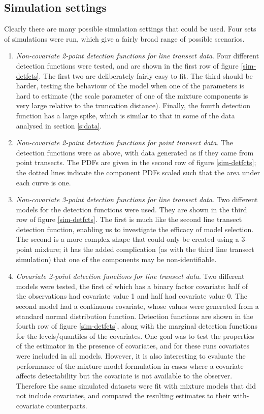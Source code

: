 \subsection{Simulation settings}
\label{cor-8s10}
Clearly there are many possible simulation settings that could be used. Four sets of simulations were run, which give a fairly broad range of possible scenarios.
\begin{enumerate}
	\item \textit{Non-covariate 2-point detection functions for line transect data}. Four different detection functions were tested, and are shown in the first row of figure \ref{sim-detfcts}. The first two are deliberately fairly easy to fit. The third should be harder, testing the behaviour of the model when one of the parameters is hard to estimate (the scale parameter of one of the mixture components is very large relative to the truncation distance). Finally, the fourth detection function has a large spike, which is similar to that in some of the data analysed in section \ref{s:data}.
	\item \textit{Non-covariate 2-point detection functions for point transect data}.  The detection functions were as above, with data generated as if they\label{cor-r1-8} came from point transects. The PDFs are given in the second row of figure \ref{sim-detfcts}; the dotted lines indicate the component PDFs scaled such that the area under each curve is one.
	\item \textit{Non-covariate 3-point detection functions for line transect data}. Two different models for the detection functions were used. They are shown in the third row of figure \ref{sim-detfcts}. The first is much like the second line transect detection function, enabling us to investigate the efficacy of model selection. The second is a more complex shape that could only be created using a 3-point mixture; it has the added complication (as with the third line transect simulation) that one of the components may be non-identifiable.
	\item \textit{Covariate 2-point detection functions for line transect data}. Two different models were tested, the first of which has a binary factor covariate: half of the observations had covariate value 1 and half had covariate value 0. The second model had a continuous covariate, whose values were generated from a standard normal distribution function. Detection functions are shown in the fourth row of figure \ref{sim-detfcts}, along with the marginal detection functions for the levels/quantiles of the covariates. One goal was to test the properties of the estimator in the presence of covariates, and for these runs covariates were included in all models.  However, it is also interesting to evaluate the performance of the mixture model formulation in cases where a covariate affects detectability but the covariate is not available to the observer. Therefore the same simulated datasets were fit with mixture models that did not include covariates, and compared the resulting estimates to their with-covariate counterparts.
\end{enumerate}

